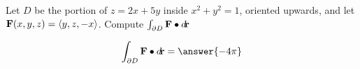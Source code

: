 \documentclass{ximera}
\author{David Guichard \and Neal Koblitz \and H. Jerome Keisler \and Albert Scheller \and Barry Balof \and Mike Wills \and Matthew Carr}
\begin{document}
\begin{exercise}




Let $D$ be the portion of $z=2x+5y$ inside $x^2+y^2=1$, oriented upwards, and let $\mathbf{F}(x,y,z)=\left\langle y,z,-x\right\rangle$. Compute $\int_{\partial D}\mathbf{F}\bullet\mathop{}\!d\!\mathbf{r}$

\begin{prompt}
\[
\int_{\partial D}\vec{F}\dotp\d\vec{r}=\answer{-4\pi}
\]
\end{prompt}


\end{exercise}
\end{document}
